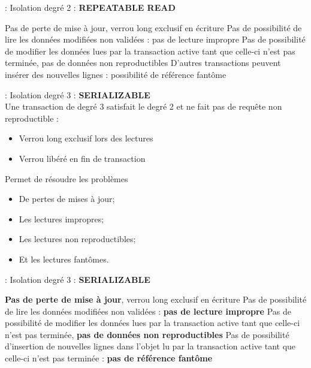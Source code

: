 \documentclass[10pt]{beamer}
\begin{document}
\begin{frame}{\secname : \subsecname}
    Isolation degré 2 : \textbf{REPEATABLE READ} \\
    \begin{itemize}
        \pro Pas de perte de mise à jour, verrou long exclusif en écriture
        \pro Pas de  possibilité de lire les données modifiées non validées : pas de lecture impropre
        \pro Pas de possibilité de modifier les données lues par la transaction active tant que celle-ci n'est pas terminée, pas de données non reproductibles
        \con D'autres transactions peuvent insérer des nouvelles lignes : possibilité de référence fantôme
    \end{itemize}
\end{frame}

\begin{frame}{\secname : \subsecname}
    Isolation degré 3 : \textbf{SERIALIZABLE} \\
    Une transaction de degré 3 satisfait le degré 2 et ne fait pas de requête non reproductible :
    \begin{itemize}
        \item Verrou long exclusif lors des lectures
        \item Verrou libéré en fin de transaction
    \end{itemize}
    Permet de résoudre les problèmes
    \begin{itemize}
        \item De pertes de mises à jour;
        \item Les lectures impropres;
        \item Les lectures non reproductibles;
        \item Et les lectures fantômes.
    \end{itemize}
\end{frame}

\begin{frame}{\secname : \subsecname}
    Isolation degré 3 : \textbf{SERIALIZABLE} \\
    \begin{itemize}
        \pro \textbf{Pas de perte de mise à jour}, verrou long exclusif en écriture
        \pro Pas de  possibilité de lire les données modifiées non validées : \textbf{pas de lecture impropre}
        \pro Pas de possibilité de modifier les données lues par la transaction active tant que celle-ci n'est pas terminée, \textbf{pas de données non reproductibles}
        \pro Pas de possibilité d'insertion de nouvelles lignes dans l'objet lu par la transaction active tant que celle-ci n'est pas terminée : \textbf{pas de référence fantôme}
    \end{itemize}
\end{frame}
\end{document}

